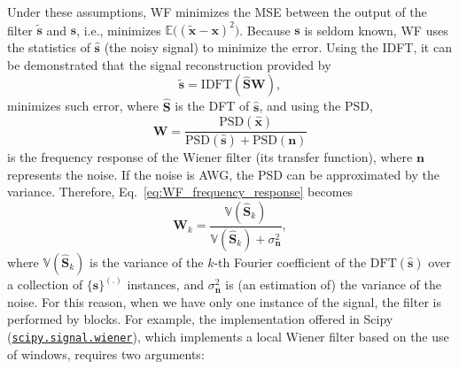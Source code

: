 Under these assumptions, \gls{WF} minimizes the \gls{MSE} between the
output of the filter $\tilde{\mathbf{s}}$ and $\mathbf{s}$, i.e.,
minimizes $\mathbb{E}\big((\tilde{\mathbf{x}} -
\mathbf{x})^2\big)$. Because $\mathbf{s}$ is seldom known, \gls{WF}
uses the statistics of $\hat{\mathbf{s}}$ (the noisy signal) to
minimize the error. Using the \gls{IDFT}, it can be demonstrated
\cite{wiener1942extrapolation} that the signal reconstruction provided
by
\begin{equation}
  \tilde{\mathbf{s}} = \text{IDFT}(\hat{\mathbf{S}}\mathbf{W}),
  \label{eq:WF}
\end{equation}
minimizes such error, where $\hat{\mathbf{S}}$ is the \gls{DFT} of
$\hat{\mathbf{s}}$, and using the \gls{PSD},
\begin{equation}
  \mathbf{W} = \frac{\text{PSD}(\hat{\mathbf{x}})}{\text{PSD}(\hat{\mathbf{s}}) + \text{PSD}(\mathbf{n})}
  \label{eq:WF_frequency_response}
\end{equation}
is the frequency response of the Wiener filter (its transfer
function), where $\mathbf{n}$ represents the noise. If the noise is
\gls{AWG}, the \gls{PSD} can be approximated by the
variance. Therefore, Eq.~\ref{eq:WF_frequency_response} becomes
\begin{equation}
  \mathbf{W}_k = \frac{\mathbb{V}(\hat{\mathbf{S}}_k)}{\mathbb{V}(\hat{\mathbf{S}}_k) + \sigma^2_{\mathbf{n}}},
  \label{eq:WF_coeffs}
\end{equation}
where $\mathbb{V}(\hat{\mathbf{S}}_k)$ is the variance of the $k$-th
Fourier coefficient of the $\text{DFT}(\hat{\mathbf{s}})$ over a
collection of $\{\hat{\mathbf{s}}\}^{(.)}$ instances, and
$\sigma^2_{\mathbf{n}}$ is (an estimation of) the variance of the
noise. For this reason, when we have only one instance of the signal,
the filter is performed by blocks. For example, the implementation
offered in Scipy
(\href{https://docs.scipy.org/doc/scipy/reference/generated/scipy.signal.wiener.html}{\texttt{scipy.signal.wiener}}),
which implements a local Wiener filter based on the use of windows,
requires two arguments:

